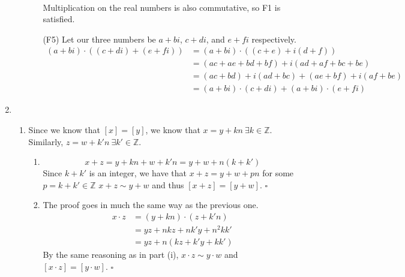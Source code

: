 \documentclass[12pt]{article}
\begin{document}
\begin{enumerate}
\begin{enumerate}
\begin{itemize}
\begin{align*}
                            \end{align*}
                            Multiplication on the real numbers is also commutative, so F1 is satisfied.
                        \item[(F5)] Let our three numbers be $a+bi$, $c+di$, and $e+fi$ respectively.
                            \fontsize{10}{8}\begin{align*}
                                (a+bi)
                                \cdot ((c+di)+(e+fi)) & = (a+bi) \cdot ((c+e)+i(d+f))               \\
                                                      & = (ac+ae+bd+bf)+i(ad+af+bc+be)              \\
                                                      & = (ac+bd)+i(ad+bc)+(ae+bf)+i(af+be)         \\
                                                      & = (a+bi) \cdot (c+di) + (a+bi) \cdot (e+fi)
                            \end{align*}
                    \end{itemize}
          \end{enumerate}
    \item \begin{enumerate}
              \item Since we know that $[x]=[y]$, we know that $x=y+kn\ \exists k \in \mathbb{Z}$.
                    Similarly, $z=w+k'n\ \exists k' \in \mathbb{Z}$.
                    \begin{enumerate}
                        \item \[x+z=y+kn+w+k'n=y+w+n(k+k')\]
                              Since $k+k'$ is an integer, we have that $x+z=y+w+pn$
                              for some $p=k+k' \in \mathbb{Z}$ $x+z \sim y+w$ and thus $[x+z]=[y+w]$. $\square$
                        \item The proof goes in much the same way as the previous one.
                              \begin{align*}
                                  x \cdot z & = (y+kn) \cdot (z+k'n) \\
                                            & = yz+nkz+nk'y+n^2 k k' \\
                                            & =yz+n(kz+k'y+kk')
                              \end{align*}
                              By the same reasoning as in part (i), $x \cdot z \sim y \cdot w$ and $[x \cdot z]=[y \cdot w]$. $\square$

\end{enumerate}
\end{enumerate}
\end{enumerate}
\end{document}
